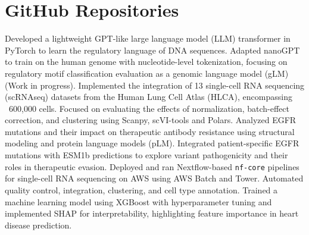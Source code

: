 \documentclass[11pt,a4paper,sans]{moderncv}
\begin{document}
\section{GitHub Repositories}
    {{\footnotesize Developed a lightweight GPT-like large language model (LLM) transformer in PyTorch to learn the regulatory language of DNA sequences. Adapted nanoGPT to train on the human genome with nucleotide-level tokenization, focusing on regulatory motif classification evaluation as a genomic language model (gLM) (Work in progress).}}{}{}
    {}
    {{\footnotesize Implemented the integration of 13 single-cell RNA sequencing (scRNAseq) datasets from the Human Lung Cell Atlas (HLCA), encompassing ~600,000 cells. Focused on evaluating the effects of normalization, batch-effect correction, and clustering using Scanpy, scVI-tools and Polars.}}{}{}
    {}
    {{\footnotesize Analyzed EGFR mutations and their impact on therapeutic antibody resistance using structural modeling and protein language models (pLM). Integrated patient-specific EGFR mutations with ESM1b predictions to explore variant pathogenicity and their roles in therapeutic evasion.}}{}{}
    {}
    {{\footnotesize Deployed and ran Nextflow-based \texttt{nf-core} pipelines for single-cell RNA sequencing on AWS using AWS Batch and Tower. Automated quality control, integration, clustering, and cell type annotation.}}{}{}
    {}
    {{\footnotesize Trained a machine learning model using XGBoost with hyperparameter tuning and implemented SHAP for interpretability, highlighting feature importance in heart disease prediction.}}{}{}
\end{document}
